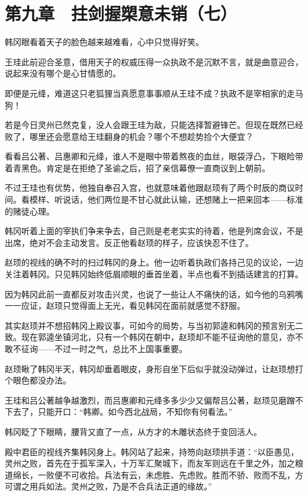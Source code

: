 \section{第九章　拄剑握槊意未销（七）}

韩冈眼看着天子的脸色越来越难看，心中只觉得好笑。

王珪此前迎合圣意，借用天子的权威压得一众执政不是沉默不言，就是曲意迎合，说起来没有哪个是心甘情愿的。

即便是元绛，难道这只老狐狸当真愿意事事顺从王珪不成？执政不是宰相家的走马狗！

若是今日灵州已然克复，没人会跟王珪为敌，只能选择暂避锋芒。但现在既然已经败了，哪里还会愿意给王珪翻身的机会？哪个不想趁势捡个大便宜？

看看吕公著、吕惠卿和元绛，谁人不是眼中带着熬夜的血丝，眼袋浮凸，下眼睑带着青黑色。肯定是在拒绝了圣谕之后，招了亲信幕僚一直商议到上朝前。

不过王珪也有优势，他独自奉召入宫，也就意味着他跟赵顼有了两个时辰的商议时间。看模样、听说话，他们两位是不甘心就此认输，还想赌上一把来回本——标准的赌徒心理。

韩冈听着上面的宰执们争来争去，自己则是老老实实的待着，他是列席会议，不是出席，绝对不会主动发言。反正他看赵顼的样子，应该快忍不住了。

赵顼的视线的确不时的扫过韩冈的身上。他一边听着执政们各持己见的议论，一边关注着韩冈。只见韩冈始终低眉顺眼的垂首坐着，半点也看不到插话建言的打算。

因为韩冈此前一直都反对攻击兴灵，也说了一些让人不痛快的话，如今他的乌鸦嘴一一应证，赵顼只觉得面上无光，看见韩冈在面前就感觉不舒服。

其实赵顼并不想招韩冈上殿议事，可如今的局势，与当初郭逵和韩冈的预言别无二致。现在郭逵坐镇河北，只有一个韩冈在朝中，赵顼却不能不征询他的意见，亦不敢不征询——不过一时之气，总比不上国事重要。

赵顼瞅了韩冈半天，韩冈却垂着眼皮，身形自坐下后似乎就没动弹过，让赵顼想打个眼色都没办法。

王珪和吕公著越争越激烈，而吕惠卿和元绛多多少少又偏帮吕公著，赵顼见磨蹭不下去了，只能开口：“韩卿。如今西北战局，不知你有何看法。”

韩冈眨了下眼睛，腰背又直了一点，从方才的木雕状态终于变回活人。

殿中君臣的视线齐集韩冈身上。韩冈站了起来，持笏向赵顼拱手道：“以臣愚见，灵州之败，首先在于孤军深入，十万军汇聚城下，而友军则远在千里之外，加之粮道绵长，一败便不可收拾。兵法有云，未虑胜、先虑败。胜而不骄、败而不乱，方可谓之用兵如法。灵州之败，乃是不合兵法正道的缘故。”

